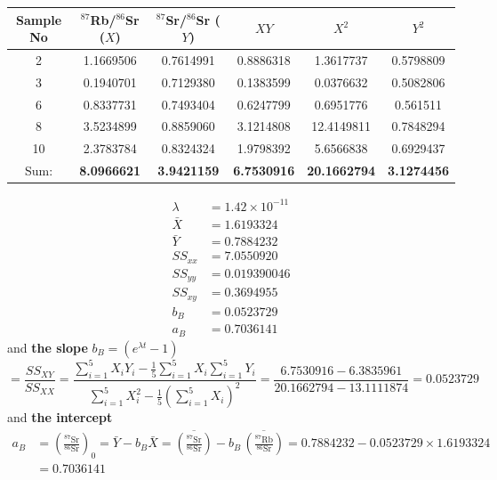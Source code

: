 \begin{description}
\begin{center}
    \medskip
    \begin{tabular}{cccccc}
      Sample No & $^{87}$Rb/$^{86}$Sr ($X$) & $^{87}$Sr/$^{86}$Sr ($Y$)
        & $XY$ & $X^2$ & $Y^2$\\
      \hline
      2  & 1.1669506 & 0.7614991 & 0.8886318 & 1.3617737  & 0.5798809\\
      3  & 0.1940701 & 0.7129380 & 0.1383599 & 0.0376632  & 0.5082806\\
      6  & 0.8337731 & 0.7493404 & 0.6247799 & 0.6951776  & 0.561511\\
      8  & 3.5234899 & 0.8859060 & 3.1214808 & 12.4149811 & 0.7848294\\
      10 & 2.3783784 & 0.8324324 & 1.9798392 & 5.6566838  & 0.6929437\\
      \hline
      Sum: & \textbf{8.0966621} & \textbf{3.9421159} & \textbf{6.7530916}
        & \textbf{20.1662794} & \textbf{3.1274456}\\
    \end{tabular}
  \end{center}

  \begin{align*}
    \lambda &= 1.42 \times 10^{-11}\\
    \bar{X} &= 1.6193324\\
    \bar{Y} &= 0.7884232\\
    SS_{xx} &= 7.0550920\\
    SS_{yy} &= 0.019390046\\
    SS_{xy} &= 0.3694955\\
    b_B &= 0.0523729\\
    a_B &= 0.7036141
  \end{align*}
  and \textbf{the slope} $b_B = \left(e^{\lambda t} - 1\right)$
  \[
    = \frac{SS_{XY}}{SS_{XX}}
    = \frac{\displaystyle\sum_{i=1}^{5} X_i Y_i
        - \frac{1}{5}\sum_{i=1}^{5} X_i \sum_{i=1}^{5} Y_i}
      {\displaystyle\sum_{i=1}^{5} X_i^2
        - \frac{1}{5}\left(\sum_{i=1}^{5} X_i\right)^{2}}
    = \frac{6.7530916 - 6.3835961}{20.1662794 - 13.1111874}
    = 0.0523729
  \]
  and \textbf{the intercept}
  \begin{align*}
    a_B &= \left(\frac{^{87}\mathrm{Sr}}{^{86}\mathrm{Sr}}\right)_0
      = \bar{Y} - b_B\bar{X}
      = \overline{\left(\frac{^{87}\mathrm{Sr}}{^{86}\mathrm{Sr}}\right)}
        - b_B\,\overline{\left(\frac{^{87}\mathrm{Rb}}{^{86}\mathrm{Sr}}\right)}
      = 0.7884232 - 0.0523729 \times 1.6193324\\
      &= 0.7036141
  \end{align*}


\end{description}
